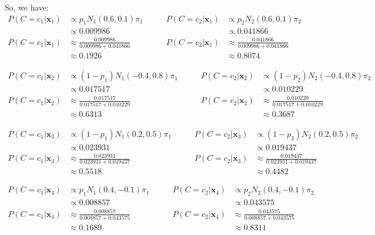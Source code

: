 \documentclass[12pt]{article}
\begin{document}
\begin{enumerate}[leftmargin=\labelsep]
    So, we have:
    \begin{equation}
    \begin{aligned}
        P(C=c_1|\mathbf{x}_1) &\propto p_1N_1(0.6, 0.1)\pi_1 &\qquad P(C=c_2|\mathbf{x}_1) &\propto p_2N_2(0.6, 0.1)\pi_2 \\
        &\propto 0.009986 &\qquad &\propto 0.041866 \\
        P(C=c_1|\mathbf{x}_1) &\approx \frac{0.009986}{0.009986+0.041866} &\qquad P(C=c_2|\mathbf{x}_1) &\approx \frac{0.041866}{0.009986+0.041866} \\
        &\approx 0.1926 &\qquad &\approx 0.8074
    \end{aligned}
    \end{equation}

    \begin{equation}
    \begin{aligned}
        P(C=c_1|\mathbf{x}_2) &\propto (1-p_1)N_1(-0.4, 0.8)\pi_1 &\qquad P(C=c_2|\mathbf{x}_2) &\propto (1-p_2)N_2(-0.4, 0.8)\pi_2 \\
        &\propto 0.017517 &\qquad &\propto 0.010229 \\
        P(C=c_1|\mathbf{x}_2) &\approx \frac{0.017517}{0.017517+0.010229} &\qquad P(C=c_2|\mathbf{x}_2) &\approx \frac{0.010229}{0.017517+0.010229} \\
        &\approx 0.6313 &\qquad &\approx 0.3687
    \end{aligned}
    \end{equation}

    \begin{equation}
    \begin{aligned}
        P(C=c_1|\mathbf{x}_3) &\propto (1-p_1)N_1(0.2, 0.5)\pi_1 &\qquad P(C=c_2|\mathbf{x}_3) &\propto (1-p_2)N_2(0.2, 0.5)\pi_2 \\
        &\propto 0.023931 &\qquad &\propto 0.019437 \\
        P(C=c_1|\mathbf{x}_3) &\approx \frac{0.023931}{0.023931+0.019437} &\qquad P(C=c_2|\mathbf{x}_3) &\approx \frac{0.019437}{0.023931+0.019437} \\
        &\approx 0.5518 &\qquad &\approx 0.4482
    \end{aligned}
    \end{equation}

    \begin{equation}
    \begin{aligned}
        P(C=c_1|\mathbf{x}_4) &\propto p_1N_1(0.4, -0.1)\pi_1 &\qquad P(C=c_2|\mathbf{x}_4) &\propto p_2N_2(0.4, -0.1)\pi_2 \\
        &\propto 0.008857 &\qquad &\propto 0.043575 \\
        P(C=c_1|\mathbf{x}_4) &\approx \frac{0.008857}{0.008857+0.043575} &\qquad P(C=c_2|\mathbf{x}_4) &\approx \frac{0.043575}{0.008857+0.043575} \\
        &\approx 0.1689 &\qquad &\approx 0.8311
    \end{aligned}
    \end{equation}


\end{enumerate}
\end{document}
